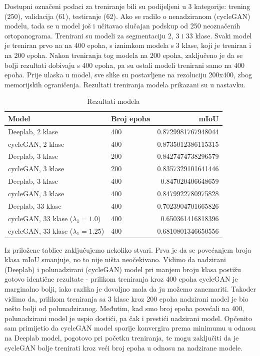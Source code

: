 \noindent Dostupni označeni podaci za treniranje bili su podijeljeni u 3 kategorije: trening (250), validacija (61), testiranje (62). Ako se radilo o nenadziranom (cycleGAN) modelu, tada se u model još i učitavao slučajan podskup od 250 neoznačenih ortopanograma. Trenirani su modeli za segmentaciju 2, 3 i 33 klase. Svaki model je treniran prvo na na 400 epoha, s iznimkom modela s 3 klase, koji je treniran i na 200 epoha. Nakon treniranja tog modela na 200 epoha, zaključeno je da se bolji rezultati dobivaju s 400 epoha, pa su ostali modeli trenirani samo na 400 epoha. Prije ulaska u model, sve slike su postavljene na rezoluciju 200x400, zbog memorijskih ograničenja. Rezultati treniranja modela prikazani su u nastavku.\\

\begin{table}[htb]
\caption{Rezultati modela}
\label{tbl:konstante}
\centering
\begin{tabular}{llr} \hline
Model & Broj epoha & mIoU\\ \hline
Deeplab, 2 klase & 400 & 0.8729981767948044 \\
cycleGAN, 2 klase & 400 & 0.8735012386115315 \\
Deeplab, 3 klase & 200 & 0.8427474738296579 \\
cycleGAN, 3 klase & 200 & 0.8357329101641446 \\
Deeplab, 3 klase & 400 & 0.847020406648659 \\
cycleGAN, 3 klase & 400 & 0.8479922780975828\\
Deeplab, 33 klase & 400 & 0.7023904701665826\\
cycleGAN, 33 klase ($\lambda_{1} = 1.0$) & 400 & 0.650361416818396\\
cycleGAN, 33 klase ($\lambda_{1} = 1.25$) & 400 & 0.6810801346650556\\ \hline
\end{tabular}
\end{table}

\noindent Iz priložene tablice zaključujemo nekoliko stvari. Prva je da se povećanjem broja klasa mIoU smanjuje, no to nije ništa neočekivano. Vidimo da nadzirani (Deeplab) i polunadzirani (cycleGAN) model pri manjem broju klasa postižu gotovo identične rezultate - prilikom treniranja kroz 400 epoha cycleGAN je marginalno bolji, iako razlika je dovoljno mala da ju možemo zanemariti. Također vidimo da, prilikom treniranja sa 3 klase kroz 200 epoha nadzirani model je bio nešto bolji od polunadziranog. Međutim, kad smo broj epoha povećali na 400, polunadzirani model je uspio dostići, pa čak i prestići nadzirani model. Općenito sam primijetio da cycleGAN model sporije konvergira prema minimumu u odnosu na Deeplab model, pogotovo pri početku treniranja, te mogu zaključiti da je cycleGAN bolje trenirati kroz veći broj epoha u odnosu na nadzirane modele. \\ \\

